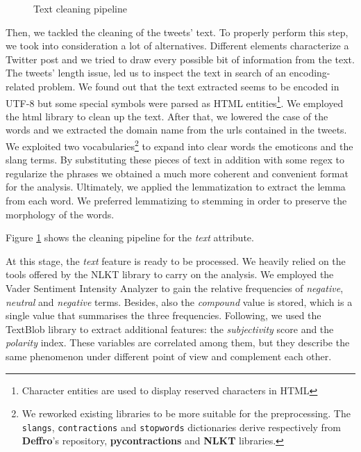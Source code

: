 \documentclass[conference]{IEEEtran}
\begin{document}
\begin{figure}[h]
        \centering
        
        \caption{Text cleaning pipeline}
        \label{fig:cleaning_schema}
\end{figure}
Then, we tackled the cleaning of the tweets' text. To properly perform this step, we took into consideration a lot of alternatives. Different elements characterize a Twitter post and we tried to draw every possible bit of information from the text. The tweets' length issue, led us to inspect the text in search of an encoding-related problem. We found out that the text extracted seems to be encoded in UTF-8\cite{utf8} but some special symbols were parsed as HTML entities\footnote{Character entities are used to display reserved characters in HTML}. We employed the html library to clean up the text. After that, we lowered the case of the words and we extracted the domain name from the urls contained in the tweets. We exploited two vocabularies\footnote{{We reworked existing libraries to be more suitable for the preprocessing. The \texttt{slangs}, \texttt{contractions} and \texttt{stopwords} dictionaries derive respectively from \textbf{Deffro}'s repository\cite{deffro}, \textbf{pycontractions} and \textbf{NLKT} libraries.}} to expand into clear words the emoticons and the slang terms. By substituting these pieces of text in addition with some regex to regularize the phrases we obtained a much more coherent and convenient format for the analysis. Ultimately, we applied the lemmatization\cite{lemmatization} to extract the lemma from each word. We preferred lemmatizing to stemming\cite{stemming} in order to preserve the morphology of the words\cite{stemmingVSlemmatizing}.

Figure \ref{fig:cleaning_schema} shows the cleaning pipeline for the \textit{text} attribute.

At this stage, the \textit{text} feature is ready to be processed. We heavily relied on the tools offered by the NLKT library\cite{nlkt} to carry on the analysis. We employed the Vader Sentiment Intensity Analyzer\cite{vader} to gain the relative frequencies of \textit{negative}, \textit{neutral} and \textit{negative} terms. Besides, also the \textit{compound} value is stored, which is a single value that summarises the three frequencies. Following, we used the TextBlob library\cite{textblob} to extract additional features: the \textit{subjectivity} score and the \textit{polarity} index. These variables are correlated among them, but they describe the same phenomenon under different point of view and complement each other.
\end{document}

